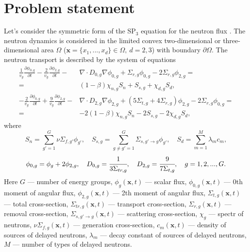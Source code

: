 \documentclass[a4paper]{jpconf}
\begin{document}
\section{Problem statement}
Let’s consider the symmetric form of the $\mathrm{SP_3}$ equation for the neutron flux \cite{ryu2013fem}.
The neutron dynamics is considered in the limited convex two-dimensional or three-dimensional area  $\Omega$ ($\bm x = \{x_1, ..., x_d\} \in \Omega, \ d = 2,3$) with boundary $\partial \Omega$. 
The neutron transport is described by the system of equations
\begin{equation}\label{1.1}
\begin{split}
 \frac{1}{v_g} \frac{\partial \phi_{0,g}}{\partial t} - \frac{2}{v_g} \frac{\partial \phi_{2,g}}{\partial t} - & \nabla \cdot D_{0,g} \nabla \phi_{0,g} + \Sigma_{r,g} \phi_{0,g} -  2\Sigma_{r,g} \phi_{2,g} = \\ 
 =  & (1-\beta)\chi_{n,g} S_{n} + S_{s,g} + \chi_{d,g} S_d, \\
 -\frac{2}{v_g} \frac{\partial \phi_{0,g}}{\partial t} + \frac{9}{v_g} \frac{\partial \phi_{2,g}}{\partial t} - & \nabla \cdot D_{2,g} \nabla \phi_{2,g} + (5\Sigma_{t,g} + 4\Sigma_{r,g}) \phi_{2,g} - 2\Sigma_{r,g} \phi_{0,g} = \\ 
 =  & -2(1-\beta)\chi_{n,g} S_{n} - 2S_{s,g} - 2\chi_{d,g} S_d,
\end{split}
\end{equation}
where
\[
S_{n} =  \sum_{g'=1}^{G} \nu \Sigma_{f,g'} \phi_{g'}, 
\quad
S_{s,g} = \sum_{g\neq g'=1}^{G} \Sigma_{s,g'\rightarrow g} \phi_{g'},
\quad
S_{d} = \sum_{m=1}^{M} \lambda_m c_m,
\]
\[
\phi_{0,g}=\phi_g + 2\phi_{2,g}, 
\quad
D_{0,g} = \cfrac{1}{3\Sigma_{tr,g}}, 
\quad
D_{2,g} = \cfrac{9}{7\Sigma_{t,g}}, 
\quad g=1,2,...,G.
\]
Here $G$ --- number of energy groups,
$\phi_g(\bm x, t)$ --- scalar flux,
$\phi_{0,g}(\bm x, t)$ --- 0th moment of angular flux,
$\phi_{2,g}(\bm x, t)$ --- 2th moment of angular flux,
$\Sigma_{t,g}(\bm x, t)$ --- total cross-section, 
$\Sigma_{tr,g}(\bm x, t)$ --- transport cross-section, 
$\Sigma_{r,g}(\bm x, t)$ --- removal cross-section,
$\Sigma_{s,g'\rightarrow g}(\bm x, t)$ --- scattering cross-section,
$\chi_g$  --- spectr of neutrons, 
$\nu\Sigma_{f,g}(\bm x, t)$ --- generation cross-section,
$c_m(\bm x, t)$ --- density of sources of delayed neutrons,
$\lambda_m$ --- decay constant of sources of delayed neutrons,
$M$ --- number of types of delayed neutrons.
\end{document}
